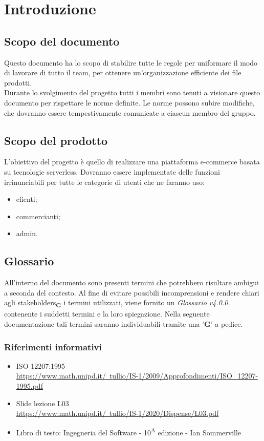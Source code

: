 \section{Introduzione}
\subsection{Scopo del documento}
Questo documento ha lo scopo di stabilire tutte le regole per uniformare il modo di lavorare di tutto il team, per ottenere un'organizzazione efficiente dei file prodotti.\\Durante lo svolgimento del progetto tutti i membri sono tenuti a visionare questo documento per rispettare le norme definite.
Le norme possono subire modifiche, che dovranno essere tempestivamente comunicate a ciascun membro del gruppo.

\subsection{Scopo del prodotto}
L'obiettivo del progetto è quello di realizzare una piattaforma e-commerce basata su tecnologie serverless. Dovranno essere implementate delle funzioni irrinunciabili per tutte le categorie di utenti che ne faranno uso:
\begin{itemize}
    \item clienti;
    \item commercianti;
    \item admin.
\end{itemize}
\subsection{Glossario}
All'interno del documento sono presenti termini che potrebbero risultare ambigui a seconda del contesto. Al fine di evitare possibili incomprensioni
e rendere chiari agli stakeholders\textsubscript{\textbf{G}} i termini utilizzati, viene fornito un \textit{Glossario v4.0.0.} contenente i suddetti termini
e la loro spiegazione. Nella seguente documentazione tali termini saranno individuabili tramite una '\textbf{G}' a pedice.


\subsubsection{Riferimenti informativi}
\begin{itemize}
    \item ISO 12207:1995\\
          \href{https://www.math.unipd.it/~tullio/IS-1/2009/Approfondimenti/ISO\_12207-1995.pdf}{https://www.math.unipd.it/~tullio/IS-1/2009/Approfondimenti/ISO\_12207-1995.pdf}
    \item Slide lezione L03\\ \href{https://www.math.unipd.it/~tullio/IS-1/2020/Dispense/L03.pdf}{https://www.math.unipd.it/~tullio/IS-1/2020/Dispense/L03.pdf}
    \item Libro di testo: Ingegneria del Software - 10\textsuperscript{A} edizione - Ian Sommerville
\end{itemize}